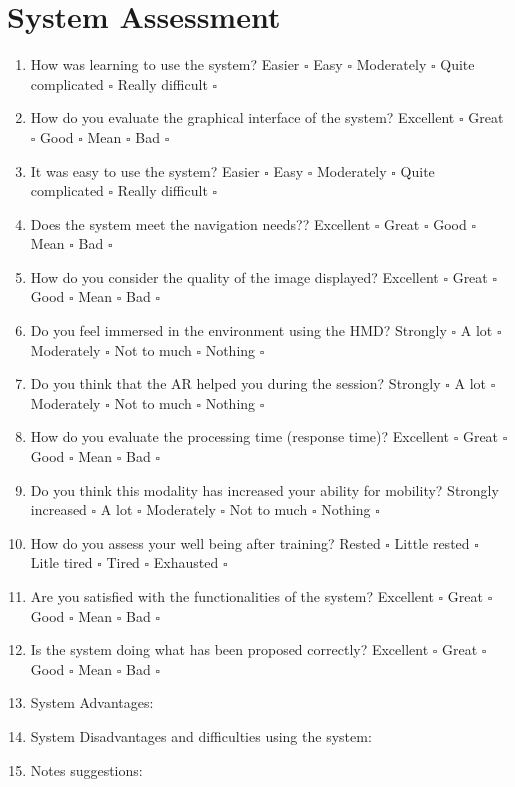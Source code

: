 \section{System Assessment}
\begin{enumerate}
\item How was learning to use the system?
\newline Easier $\square$ Easy $\square$ Moderately $\square$ Quite complicated $\square$ Really difficult $\square$
\item How do you evaluate the graphical interface of the system?
\newline Excellent $\square$ Great $\square$ Good $\square$ Mean $\square$ Bad $\square$
\item It was easy to use the system?
\newline Easier $\square$ Easy $\square$ Moderately $\square$ Quite complicated $\square$ Really difficult $\square$
\item Does the system meet the navigation needs??
\newline Excellent $\square$ Great $\square$ Good $\square$ Mean $\square$ Bad $\square$
\item How do you consider the quality of the image displayed?
\newline Excellent $\square$ Great $\square$ Good $\square$ Mean $\square$ Bad $\square$
\item Do you feel immersed in the environment using the HMD?
\newline Strongly $\square$ A lot $\square$ Moderately $\square$ Not to much $\square$ Nothing $\square$
\item Do you think that the AR helped you during the session?
\newline Strongly $\square$ A lot $\square$ Moderately $\square$ Not to much $\square$ Nothing $\square$
\item How do you evaluate the processing time (response time)?
\newline Excellent $\square$ Great $\square$ Good $\square$ Mean $\square$ Bad $\square$
\item Do you think this modality has increased your ability for mobility?
\newline Strongly increased $\square$ A lot $\square$ Moderately $\square$ Not to much $\square$ Nothing $\square$
\item How do you assess your well being after training?
\newline Rested  $\square$ Little rested $\square$ Litle tired  $\square$ Tired $\square$  Exhausted  $\square$ 
\item Are you satisfied with the functionalities of the system?
\newline Excellent $\square$ Great $\square$ Good $\square$ Mean $\square$ Bad $\square$
\item Is the system doing what has been proposed correctly?
\newline Excellent $\square$ Great $\square$ Good $\square$ Mean $\square$ Bad $\square$

\item System Advantages:
\item System Disadvantages and difficulties using the system:
\item Notes suggestions:
\end{enumerate}




